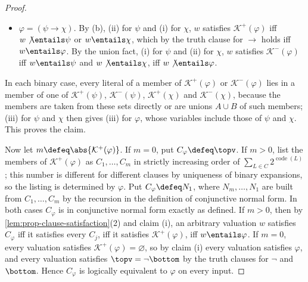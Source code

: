 \begin{proof}
\begin{itemize}
        \(\mathcal K^{+}(\varphi)\) iff \(w\entails\psi\) or
        \(w\entails\chi\), iff \(w\entails\varphi\).  By (ii) and the union
        fact, \(w\) satisfies \(\mathcal K^{-}(\varphi)\) iff
        \(w\not\entails\psi\) and \(w\not\entails\chi\), iff
        \(w\not\entails\varphi\).
  \item \(\varphi=(\psi\to\chi)\).  By (b), (ii) for \(\psi\) and (i) for
        \(\chi\), \(w\) satisfies \(\mathcal K^{+}(\varphi)\) iff
        \(w\not\entails\psi\) or \(w\entails\chi\), which by the truth
        clause for \(\to\) holds iff \(w\entails\varphi\).  By the union
        fact, (i) for \(\psi\) and (ii) for \(\chi\), \(w\) satisfies
        \(\mathcal K^{-}(\varphi)\) iff \(w\entails\psi\) and
        \(w\not\entails\chi\), iff \(w\not\entails\varphi\).
\end{itemize}
In each binary case, every literal of a member of \(\mathcal K^{+}(\varphi)\)
or \(\mathcal K^{-}(\varphi)\) lies in a member of one of
\(\mathcal K^{+}(\psi)\), \(\mathcal K^{-}(\psi)\), \(\mathcal K^{+}(\chi)\)
and \(\mathcal K^{-}(\chi)\), because the members
are taken from these sets directly or are unions \(A\cup B\) of such
members; (iii) for \(\psi\) and \(\chi\) then gives (iii) for \(\varphi\),
whose variables include those of \(\psi\) and \(\chi\).  This proves the
claim.

Now let \(m\defeq\abs{\mathcal K^{+}(\varphi)}\).  If \(m=0\), put
\(C_\varphi\defeq\topv\).  If \(m>0\), list the members of
\(\mathcal K^{+}(\varphi)\) as \(C_1,\ldots,C_m\) in strictly increasing
order of \(\sum_{L\in C}2^{\operatorname{code}(L)}\); this number is
different for different clauses by uniqueness of binary expansions, so
the listing is determined by \(\varphi\).  Put \(C_\varphi\defeq N_1\),
where \(N_m,\ldots,N_1\) are built from \(C_1,\ldots,C_m\) by the recursion
in the definition of conjunctive normal form.  In both cases
\(C_\varphi\) is in conjunctive normal form exactly as defined.  If
\(m>0\), then by \cref{lem:prop-clause-satisfaction}(2) and claim (i), an
arbitrary valuation \(w\) satisfies \(C_\varphi\) iff it satisfies every
\(C_j\), iff it satisfies \(\mathcal K^{+}(\varphi)\), iff
\(w\entails\varphi\).  If \(m=0\), every valuation satisfies
\(\mathcal K^{+}(\varphi)=\varnothing\), so by claim (i) every valuation
satisfies \(\varphi\), and every valuation satisfies
\(\topv=\neg\bottom\) by the truth clauses for \(\neg\) and \(\bottom\).
Hence \(C_\varphi\) is logically equivalent to \(\varphi\) on every
input.


\end{proof}
